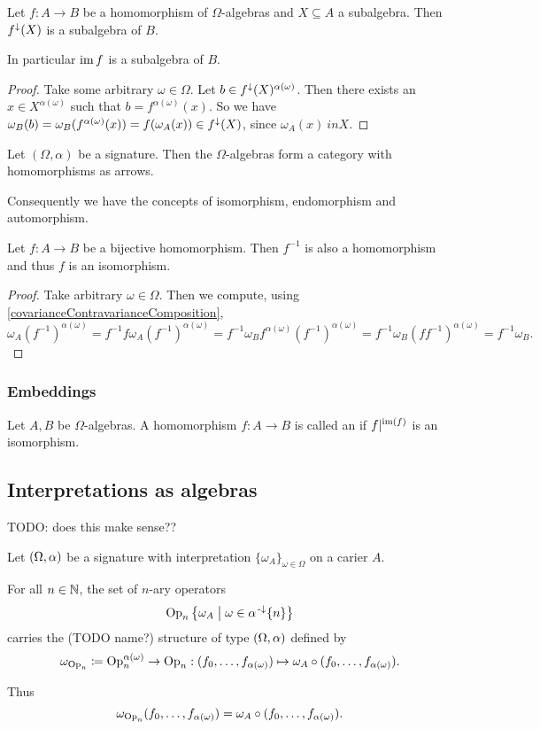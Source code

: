 \begin{proposition} \label{imageSubalgebra}
Let $f:A\to B$ be a homomorphism of $\Omega$-algebras and $X\subseteq A$ a subalgebra. Then $f^{\downarrow}(X)$ is a subalgebra of $B$.
\end{proposition}
In particular $\operatorname{im} f$ is a subalgebra of $B$.
\begin{proof}
Take some arbitrary $\omega\in\Omega$. Let $b\in f^{\downarrow}(X)^{\alpha(\omega)}$. Then there exists an $x\in X^{\alpha(\omega)}$ such that $b = f^{\alpha(\omega)}(x)$. So we have $\omega_B(b) = \omega_B(f^{\alpha(\omega)}(x)) = f(\omega_A(x)) \in f^\downarrow(X)$, since $\omega_A(x)\ in X$.
\end{proof}

\begin{proposition}
Let $(\Omega,\alpha)$ be a signature. Then the $\Omega$-algebras form a category with homomorphisms as arrows.
\end{proposition}
Consequently we have the concepts of isomorphism, endomorphism and automorphism.

\begin{proposition} \label{bijectiveHomomorphism}
Let $f:A\to B$ be a bijective homomorphism. Then $f^{-1}$ is also a homomorphism and thus $f$ is an isomorphism.
\end{proposition}
\begin{proof}
Take arbitrary $\omega\in\Omega$. Then we compute, using \ref{covarianceContravarianceComposition},
\[ \omega_A (f^{-1})^{\alpha(\omega)} = f^{-1} f\omega_A (f^{-1})^{\alpha(\omega)} = f^{-1}\omega_B f^{\alpha(\omega)} (f^{-1})^{\alpha(\omega)} = f^{-1}\omega_B (f f^{-1})^{\alpha(\omega)} = f^{-1}\omega_B. \]
\end{proof}

\subsubsection{Embeddings}
\begin{definition}
Let $A,B$ be $\Omega$-algebras. A homomorphism $f:A\to B$ is called an  if $f|^{\operatorname{im}(f)}$ is an isomorphism.
\end{definition}

\subsection{Interpretations as algebras}
TODO: does this make sense??
\begin{definition}
Let $\sSet{\Omega, \alpha}$ be a signature with interpretation $\{\omega_A\}_{\omega\in \Omega}$ on a carier $A$.

For all $n\in \mathbb{N}$, the set of $n$-ary operators
\[ \Op_n \setbuilder{\omega_A}{\omega\in \alpha^{\preimf}\{n\}} \]
carries the  (TODO name?) structure of type $\sSet{\Omega, \alpha}$ defined by
\[ \omega_{\operatorname{Op}_n} \coloneqq \operatorname{Op}_n^{\alpha(\omega)}\to \operatorname{Op}_n: (f_0,\ldots, f_{\alpha(\omega)}) \mapsto \omega_A\circ (f_0,\ldots, f_{\alpha(\omega)}). \]
\end{definition}
Thus
\[ \omega_{\operatorname{Op}_n}(f_0,\ldots, f_{\alpha(\omega)}) = \omega_A\circ (f_0,\ldots, f_{\alpha(\omega)}). \]

